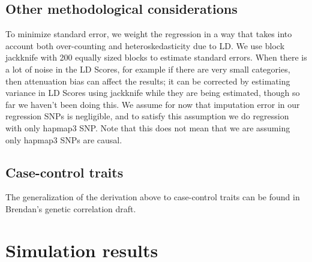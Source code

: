 \documentclass[11pt]{article}
\begin{document}
\subsection{Other methodological considerations}
To minimize standard error, we weight the regression in a way that takes into account both over-counting and heteroskedasticity due to LD. We use block jackknife with 200 equally sized blocks to estimate standard errors. When there is a lot of noise in the LD Scores, for example if there are very small categories, then attenuation bias can affect the results; it can be corrected by estimating variance in LD Scores using jackknife while they are being estimated, though so far we haven't been doing this. We assume for now that imputation error in our regression SNPs is negligible, and to satisfy this assumption we do regression with only hapmap3 SNP. Note that this does not mean that we are assuming only hapmap3 SNPs are causal.

\subsection{Case-control traits}
The generalization of the derivation above to case-control traits can be found in Brendan's genetic correlation draft.

\section{Simulation results}
\end{document}
